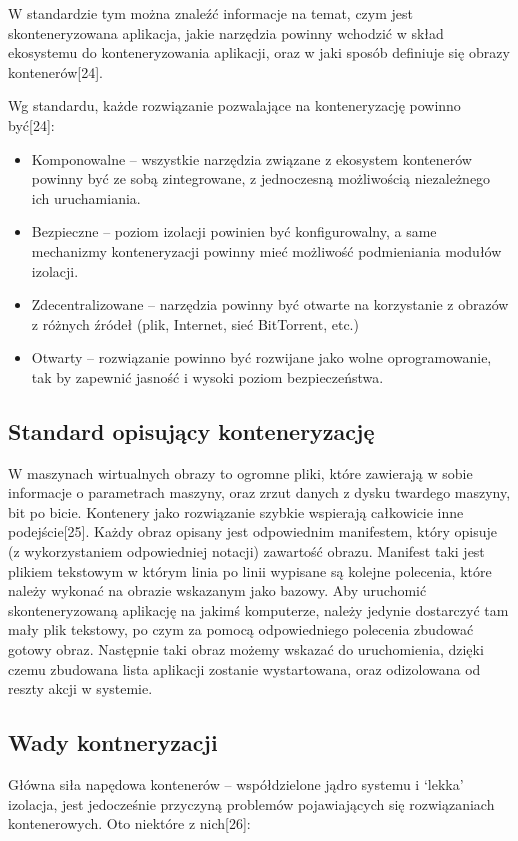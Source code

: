 \documentclass[10pt,a4paper,titlepage,twoside]{report}
\begin{document}
\indent \indent W standardzie tym można znaleźć informacje na temat, czym jest skonteneryzowana aplikacja, jakie narzędzia powinny wchodzić w skład ekosystemu do konteneryzowania aplikacji, oraz w jaki sposób definiuje się obrazy kontenerów[24].

\indent \indent Wg standardu, każde rozwiązanie pozwalające na konteneryzację powinno być[24]:
\begin{itemize}
	\item Komponowalne – wszystkie narzędzia związane z ekosystem kontenerów powinny być ze sobą zintegrowane, z jednoczesną możliwością niezależnego ich uruchamiania.
	\item Bezpieczne – poziom izolacji powinien być konfigurowalny, a same mechanizmy konteneryzacji powinny mieć możliwość podmieniania modułów izolacji.
	\item Zdecentralizowane – narzędzia powinny być otwarte na korzystanie z obrazów z różnych źródeł (plik, Internet, sieć BitTorrent, etc.)
	\item Otwarty – rozwiązanie powinno być rozwijane jako wolne oprogramowanie, tak by zapewnić jasność i wysoki poziom bezpieczeństwa.
\end{itemize}

\subsection{Standard opisujący konteneryzację}\indent \indent
W maszynach wirtualnych obrazy to ogromne pliki, które zawierają w sobie informacje o parametrach maszyny, oraz zrzut danych z dysku twardego maszyny, bit po bicie. Kontenery jako rozwiązanie szybkie wspierają całkowicie inne podejście[25]. Każdy obraz opisany jest odpowiednim manifestem, który opisuje (z wykorzystaniem odpowiedniej notacji) zawartość obrazu. Manifest taki jest plikiem tekstowym w którym linia po linii wypisane są kolejne polecenia, które należy wykonać na obrazie wskazanym jako bazowy. Aby uruchomić skonteneryzowaną aplikację na jakimś komputerze, należy jedynie dostarczyć tam mały plik tekstowy, po czym za pomocą odpowiedniego polecenia zbudować gotowy obraz. Następnie taki obraz możemy wskazać do uruchomienia, dzięki czemu zbudowana lista aplikacji zostanie wystartowana, oraz odizolowana od reszty akcji w systemie.

\subsection{Wady kontneryzacji}\indent \indent Główna siła napędowa kontenerów – współdzielone jądro systemu i ‘lekka’ izolacja, jest jedocześnie przyczyną problemów pojawiających się rozwiązaniach kontenerowych. Oto niektóre z nich[26]:
\end{document}

